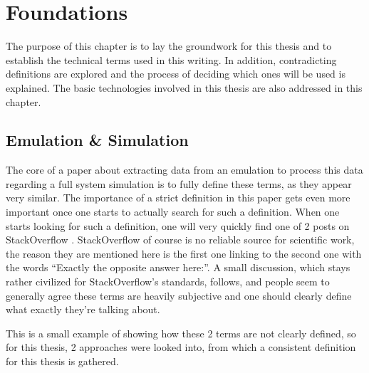 \chapter{Foundations}
The purpose of this chapter is to lay the groundwork for this thesis
and to establish the technical terms used in this writing.
In addition, contradicting definitions are explored
and the process of deciding which ones will be used is explained.
The basic technologies involved in this thesis are also addressed in this chapter.

\section{Emulation \& Simulation}
The core of a paper about extracting data from an emulation
to process this data regarding a full system simulation is to fully define these terms,
as they appear very similar.
The importance of a strict definition in this paper gets even more important
once one starts to actually search for such a definition.
When one starts looking for such a definition,
one will very quickly find one of 2 posts on StackOverflow \cite{SO_link}\cite{SO}.
StackOverflow of course is no reliable source for scientific work,
the reason they are mentioned here is the first one linking to the second one
with the words \enquote{Exactly the opposite answer here:}\cite{SO_link}.
A small discussion, which stays rather civilized for StackOverflow's standards, follows,
and people seem to generally agree these terms are heavily subjective and one should clearly define what exactly they're talking about.

This is a small example of showing how these 2 terms are not clearly defined,
so for this thesis, 2 approaches were looked into,
from which a consistent definition for this thesis is gathered.

